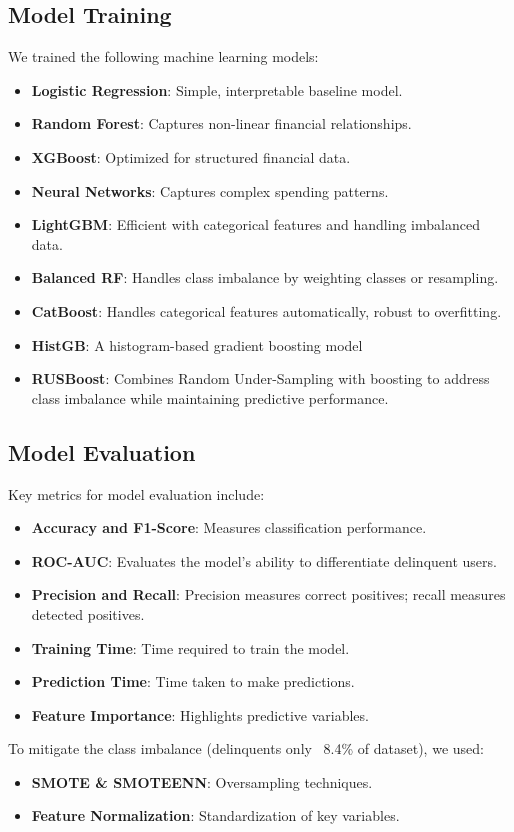 \documentclass[12pt,letterpaper]{article}
\begin{document}
\subsection{Model Training}
We trained the following machine learning models:
\begin{itemize}
    \item \textbf{Logistic Regression}: Simple, interpretable baseline model.
    \item \textbf{Random Forest}: Captures non-linear financial relationships.
    \item \textbf{XGBoost}: Optimized for structured financial data.
    \item \textbf{Neural Networks}: Captures complex spending patterns.
    \item \textbf{LightGBM}: Efficient with categorical features and handling imbalanced data.
    \item \textbf{Balanced RF}: Handles class imbalance by weighting classes or resampling.
    \item \textbf{CatBoost}: Handles categorical features automatically, robust to overfitting.
    \item \textbf{HistGB}: A histogram-based gradient boosting model
    \item \textbf{RUSBoost}: Combines Random Under-Sampling with boosting to address class imbalance while maintaining predictive performance.
  
\end{itemize}

\subsection{Model Evaluation}
Key metrics for model evaluation include:
\begin{itemize}
    \item \textbf{Accuracy and F1-Score}: Measures classification performance.
    \item \textbf{ROC-AUC}: Evaluates the model's ability to differentiate delinquent users.
    \item \textbf{Precision and Recall}: Precision measures correct positives; recall measures detected positives.
    \item \textbf{Training Time}: Time required to train the model.
    \item \textbf{Prediction Time}: Time taken to make predictions.
    \item \textbf{Feature Importance}: Highlights predictive variables.
\end{itemize}
To mitigate the class imbalance (delinquents only ~8.4\% of dataset), we used:
\begin{itemize}
    \item \textbf{SMOTE \& SMOTEENN}: Oversampling techniques.
    \item \textbf{Feature Normalization}: Standardization of key variables.
\end{itemize}
\end{document}
